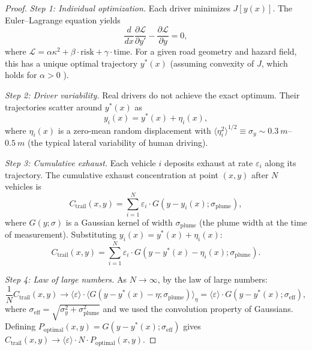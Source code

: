 \documentclass[11pt,twocolumn,a4paper]{article}
\theoremstyle{plain}
\theoremstyle{definition}
\theoremstyle{remark}
\newcommand{\Ctrail}{C_{\mathrm{trail}}}
\begin{document}
\begin{proof}
\emph{Step 1: Individual optimization.} Each driver minimizes $J[y(x)]$. The Euler--Lagrange equation \cite{gelfand2000calculus} yields
\begin{equation}
\frac{d}{dx}\frac{\partial \mathcal{L}}{\partial y'} - \frac{\partial \mathcal{L}}{\partial y} = 0,
\label{eq:euler_lagrange}
\end{equation}
where $\mathcal{L} = \alpha\kappa^2 + \beta\cdot\mathrm{risk} + \gamma\cdot\mathrm{time}$. For a given road geometry and hazard field, this has a unique optimal trajectory $y^*(x)$ (assuming convexity of $J$, which holds for $\alpha > 0$ \cite{pontryagin1962mathematical}).

\emph{Step 2: Driver variability.} Real drivers do not achieve the exact optimum. Their trajectories scatter around $y^*(x)$ as
\begin{equation}
y_i(x) = y^*(x) + \eta_i(x),
\end{equation}
where $\eta_i(x)$ is a zero-mean random displacement with $\langle\eta_i^2\rangle^{1/2} \equiv \sigma_y \sim \SI{0.3}{m}$--$\SI{0.5}{m}$ (the typical lateral variability of human driving).

\emph{Step 3: Cumulative exhaust.} Each vehicle $i$ deposits exhaust at rate $\varepsilon_i$ along its trajectory. The cumulative exhaust concentration at point $(x, y)$ after $N$ vehicles is
\begin{equation}
\Ctrail(x, y) = \sum_{i=1}^{N} \varepsilon_i \cdot G(y - y_i(x); \sigma_{\mathrm{plume}}),
\label{eq:cumulative}
\end{equation}
where $G(y; \sigma)$ is a Gaussian kernel of width $\sigma_{\mathrm{plume}}$ (the plume width at the time of measurement). Substituting $y_i(x) = y^*(x) + \eta_i(x)$:
\begin{equation}
\Ctrail(x, y) = \sum_{i=1}^N \varepsilon_i \cdot G(y - y^*(x) - \eta_i(x); \sigma_{\mathrm{plume}}).
\end{equation}

\emph{Step 4: Law of large numbers.} As $N \to \infty$, by the law of large numbers:
\begin{equation}
\frac{1}{N}\Ctrail(x, y) \to \langle\varepsilon\rangle \cdot \langle G(y - y^*(x) - \eta; \sigma_{\mathrm{plume}})\rangle_\eta = \langle\varepsilon\rangle \cdot G(y - y^*(x); \sigma_{\mathrm{eff}}),
\end{equation}
where $\sigma_{\mathrm{eff}} = \sqrt{\sigma_y^2 + \sigma_{\mathrm{plume}}^2}$ and we used the convolution property of Gaussians. Defining $P_{\mathrm{optimal}}(x, y) = G(y - y^*(x); \sigma_{\mathrm{eff}})$ gives $\Ctrail(x, y) \to \langle\varepsilon\rangle \cdot N \cdot P_{\mathrm{optimal}}(x, y)$.
\end{proof}
\end{document}

